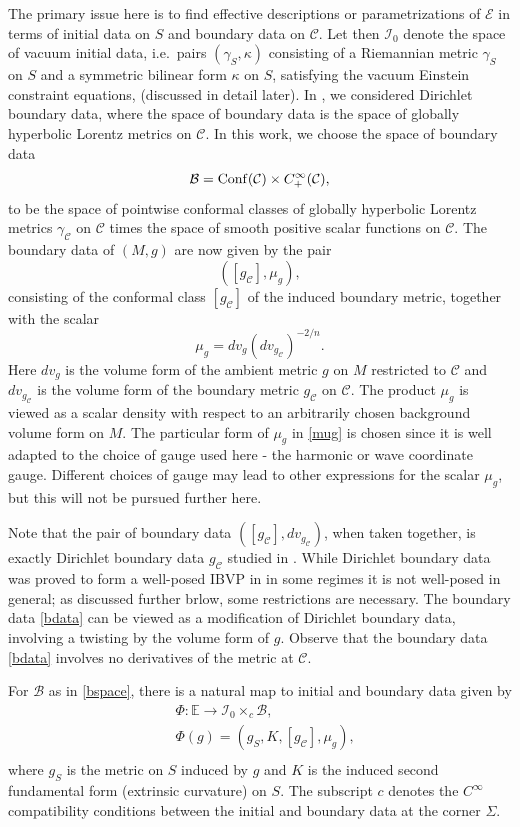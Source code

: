 \documentclass[10pt]{amsart}
\newcommand{\g}{\gamma}
\newcommand{\Si}{\Sigma}
\renewcommand{\k}{\kappa}
\newcommand{\cC}{{\mathcal C}}
\newcommand{\cB}{{\mathcal B}}
\newcommand{\cE}{{\mathcal E}}
\newcommand{\cI}{\mathcal I}
\newcommand{\bE}{\mathbb E}
\newcommand{\be}{\begin{equation}}
\newcommand{\ee}{\end{equation}}
\renewcommand{\to}{\rightarrow}
\newcommand{\<}{\langle}
\renewcommand{\>}{\rangle}
\theoremstyle{plain}
\theoremstyle{remark}
\theoremstyle{definition}
\numberwithin{equation}{section}
\begin{document}
\medskip 

  The primary issue here is to find effective descriptions or parametrizations of $\cE$ in terms of initial data on $S$ and boundary data on $\cC$. Let then 
$\cI_0$ denote the space of vacuum initial data, i.e.~pairs $(\g_S, \k)$ consisting of a Riemannian metric $\g_S$ on $S$ and a symmetric bilinear form $\k$ on $S$, 
satisfying the vacuum Einstein constraint equations, (discussed in detail later). In \cite{I}, we considered Dirichlet boundary data, where the space of boundary data is 
the space of globally hyperbolic Lorentz metrics on $\cC$. In this work, we choose the space of boundary data 
\be \label{bspace}
\cB = {\rm Conf}(\cC)\times C_+^{\infty}(\cC),
\ee
to be the space of pointwise conformal classes of globally hyperbolic Lorentz metrics $\g_{\cC}$ on $\cC$ times the space of smooth positive 
scalar functions on $\cC$. The boundary data of $(M, g)$ are now given by the pair 
\be \label{bdata}
([g_{\cC}], \mu_g),
\ee
consisting of the conformal class $[g_{\cC}]$ of the induced boundary metric, together with the scalar 
\be \label{mug}
\mu_g = dv_g (dv_{g_{\cC}})^{-2/n}.
\ee
Here $dv_g$ is the volume form of the ambient metric $g$ on $M$ restricted to $\cC$ and $dv_{g_{\cC}}$ is the volume form of the boundary metric 
$g_{\cC}$ on $\cC$. The product $\mu_g$ is viewed as a scalar density with respect to an arbitrarily chosen background volume form on $M$. 
The particular form of $\mu_g$ in \eqref{mug} is chosen since it is well adapted to the choice of gauge used here - the harmonic or wave coordinate 
gauge. Different choices of gauge may lead to other expressions for the scalar $\mu_g$, but this will not be pursued further here. 

Note that the pair of boundary data $([g_{\cC}], dv_{g_{\cC}})$, when taken together, is exactly Dirichlet boundary data $g_{\cC}$ studied in \cite{I}. While 
Dirichlet boundary data was proved to form a well-posed IBVP in \cite{I} in some regimes it is not well-posed in general; as discussed further brlow, some 
restrictions are necessary. The boundary data \eqref{bdata} can be viewed as a modification of Dirichlet boundary data, involving a twisting by the volume 
form of $g$. Observe that the boundary data \eqref{bdata} involves no derivatives of the metric at $\cC$. 

\medskip 

For $\cB$ as in \eqref{bspace}, there is a natural map to initial and boundary data given by 
\be \label{mainPhi}
\begin{split}
&\Phi: \bE \to \cI_0 \times_c \cB,\\
&\Phi(g) = (g_S, K, [g_{\cC}], \mu_g),\\
\end{split}
\ee
where $g_S$ is the metric on $S$ induced by $g$ and $K$ is the induced second fundamental form (extrinsic curvature) on $S$. 
The subscript $c$ denotes the $C^{\infty}$ compatibility conditions between the initial and boundary data at the corner $\Si$. 
\end{document}
